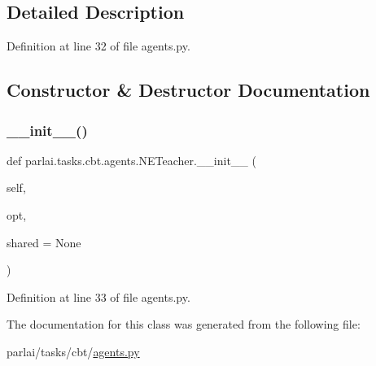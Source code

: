 \subsection{Detailed Description}


Definition at line 32 of file agents.\+py.



\subsection{Constructor \& Destructor Documentation}
\mbox{\label{classparlai_1_1tasks_1_1cbt_1_1agents_1_1NETeacher_aee59236dace0e90a86ce8ca23b8e05d2}} 
\subsubsection{\texorpdfstring{\+\_\+\+\_\+init\+\_\+\+\_\+()}{\_\_init\_\_()}}
{\footnotesize\ttfamily def parlai.\+tasks.\+cbt.\+agents.\+N\+E\+Teacher.\+\_\+\+\_\+init\+\_\+\+\_\+ (\begin{DoxyParamCaption}\item[{}]{self,  }\item[{}]{opt,  }\item[{}]{shared = {\ttfamily None} }\end{DoxyParamCaption})}



Definition at line 33 of file agents.\+py.



The documentation for this class was generated from the following file\+:\begin{DoxyCompactItemize}
\item 
parlai/tasks/cbt/\hyperlink{parlai_2tasks_2cbt_2agents_8py}{agents.\+py}\end{DoxyCompactItemize}
